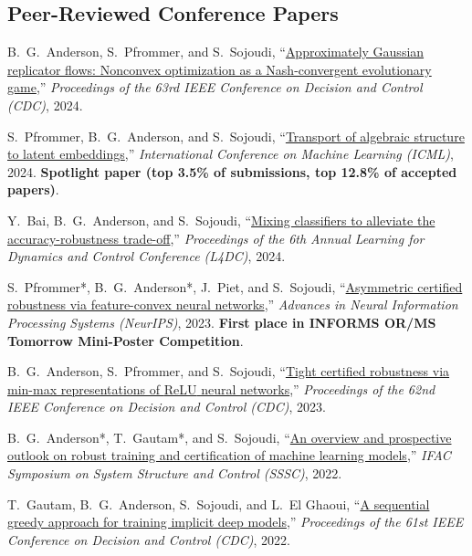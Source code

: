 \subsection{Peer-Reviewed Conference Papers}

\begin{enumerate}[label={[\arabic*]}]
	\item B.\ G.\ Anderson, S.\ Pfrommer, and S.\ Sojoudi, ``\href{https://arxiv.org/pdf/2406.19529}{Approximately Gaussian replicator flows: Nonconvex optimization as a Nash-convergent evolutionary game},'' \textit{Proceedings of the 63rd IEEE Conference on Decision and Control (CDC)}, 2024.
	\item S.\ Pfrommer, B.\ G.\ Anderson, and S.\ Sojoudi, ``\href{https://arxiv.org/pdf/2405.16763}{Transport of algebraic structure to latent embeddings},'' \textit{International Conference on Machine Learning (ICML)}, 2024. \textbf{Spotlight paper (top 3.5\% of submissions, top 12.8\% of accepted papers)}.
	\item Y.\ Bai, B.\ G.\ Anderson, and S.\ Sojoudi, ``\href{https://arxiv.org/pdf/2311.15165.pdf}{Mixing classifiers to alleviate the accuracy-robustness trade-off},'' \textit{Proceedings of the 6th Annual Learning for Dynamics and Control Conference (L4DC)}, 2024.
	\item S.\ Pfrommer*, B.\ G.\ Anderson*, J.\ Piet, and S.\ Sojoudi, ``\href{https://arxiv.org/pdf/2302.01961.pdf}{Asymmetric certified robustness via feature-convex neural networks},'' \textit{Advances in Neural Information Processing Systems (NeurIPS)}, 2023. \textbf{First place in INFORMS OR/MS Tomorrow Mini-Poster Competition}.
	\item B.\ G.\ Anderson, S.\ Pfrommer, and S.\ Sojoudi, ``\href{https://arxiv.org/pdf/2310.04916.pdf}{Tight certified robustness via min-max representations of {ReLU} neural networks},'' \textit{Proceedings of the 62nd IEEE Conference on Decision and Control (CDC)}, 2023.
	\item B.\ G.\ Anderson*, T.\ Gautam*, and S.\ Sojoudi, ``\href{https://people.eecs.berkeley.edu/~sojoudi/ifac_2022.pdf}{An overview and prospective outlook on robust training and certification of machine learning models},'' \textit{IFAC Symposium on System Structure and Control (SSSC)}, 2022.
	\item T.\ Gautam, B.\ G.\ Anderson, S.\ Sojoudi, and L.\ El Ghaoui, ``\href{https://brendon-anderson.github.io/files/publications/gautam2022sequential.pdf}{A sequential greedy approach for training implicit deep models},'' \textit{Proceedings of the 61st IEEE Conference on Decision and Control (CDC)}, 2022.

\end{enumerate}
